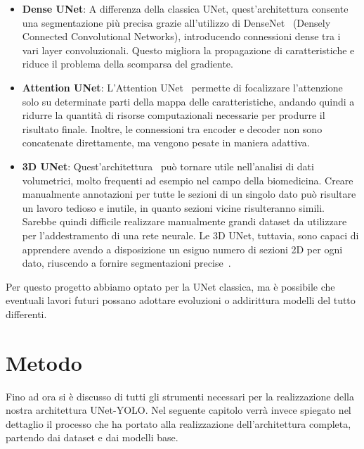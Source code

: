 \documentclass[12pt]{report}
\begin{document}
\begin{itemize}
	\item \textbf{Dense UNet}: A differenza della classica UNet, quest'architettura consente una segmentazione più precisa grazie all'utilizzo di DenseNet~\cite{8296389} (Densely Connected Convolutional Networks), introducendo connessioni dense tra i vari layer convoluzionali. Questo migliora la propagazione di caratteristiche e riduce il problema della scomparsa del gradiente.
	
	\item \textbf{Attention UNet}: L'Attention UNet~\cite{oktay2018attentionunetlearninglook} permette di focalizzare l'attenzione solo su determinate parti della mappa delle caratteristiche, andando quindi a ridurre la quantità di risorse computazionali necessarie per produrre il risultato finale. Inoltre, le connessioni tra encoder e decoder non sono concatenate direttamente, ma vengono pesate in maniera adattiva.
	
	\item \textbf{3D UNet}: Quest'architettura~\cite{çiçek20163dunetlearningdense} può tornare utile nell'analisi di dati volumetrici, molto frequenti ad esempio nel campo della biomedicina. Creare manualmente annotazioni per tutte le sezioni di un singolo dato può risultare un lavoro tedioso e inutile, in quanto sezioni vicine risulteranno simili. Sarebbe quindi difficile realizzare manualmente grandi dataset da utilizzare per l'addestramento di una rete neurale. Le 3D UNet, tuttavia, sono capaci di apprendere avendo a disposizione un esiguo numero di sezioni 2D per ogni dato, riuscendo a fornire segmentazioni precise~\cite{çiçek20163dunetlearningdense}.
\end{itemize}

Per questo progetto abbiamo optato per la UNet classica, ma è possibile che eventuali lavori futuri possano adottare evoluzioni o addirittura modelli del tutto differenti.

\chapter{Metodo}
\label{chap:metodo}

Fino ad ora si è discusso di tutti gli strumenti necessari per la realizzazione della nostra architettura UNet-YOLO. Nel seguente capitolo verrà invece spiegato nel dettaglio il processo che ha portato alla realizzazione dell'architettura completa, partendo dai dataset e dai modelli base.
\end{document}
